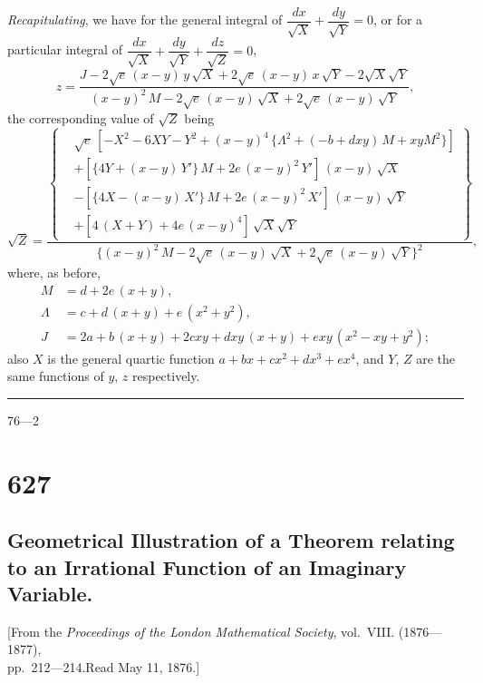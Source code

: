 \documentclass[12pt,a4paper]{article}
\begin{document}
\vspace{2ex}
\textit{Recapitulating}, we have for the general integral of $\dfrac{dx}{\surd X} + \dfrac{dy}{\surd Y} = 0$, or for a particular integral of $\dfrac{dx}{\surd X} + \dfrac{dy}{\surd Y} + \dfrac{dz}{\surd Z} = 0$,
\[
z = \frac{J - 2\surd e\,(x-y)\,y\,\surd X + 2\surd e\,(x-y)\,x\,\surd Y - 2\surd X\surd Y}{(x-y)^2\,M - 2\surd e\,(x-y)\,\surd X + 2\surd e\,(x-y)\,\surd Y},
\]
the corresponding value of $\surd Z$ being
\[
\surd Z = \frac{\left\{\begin{aligned} &\surd e\,[-X^2-6XY-Y^2+(x-y)^4\,\{\Lambda^2+(-b+dxy)\,M+xyM^2\}] \\
&+ [\{4Y+(x-y)\,Y'\}\,M+2e\,(x-y)^2\,Y']\,(x-y)\,\surd X \\
&- [\{4X-(x-y)\,X'\}\,M+2e\,(x-y)^2\,X']\,(x-y)\,\surd Y \\
&+ [4\,(X+Y)+4e\,(x-y)^4]\,\surd X\surd Y \end{aligned}\right\}}{\{(x-y)^2\,M - 2\surd e\,(x-y)\,\surd X + 2\surd e\,(x-y)\,\surd Y\}^2},
\]
where, as before,
\begin{align*}
M &= d + 2e\,(x+y), \\
\Lambda &= c + d\,(x+y) + e\,(x^2+y^2), \\
J &= 2a + b\,(x+y) + 2cxy + dxy\,(x+y) + exy\,(x^2-xy+y^2);
\end{align*}
also $X$ is the general quartic function $a+bx+cx^2+dx^3+ex^4$, and $Y$, $Z$ are the same functions of $y$, $z$ respectively.

\noindent\rule{2em}{0.4pt}\hfill 76---2
\newpage

\section*{627}
\subsection*{Geometrical Illustration of a Theorem relating to an Irrational Function of an Imaginary Variable.}

\begin{center}
\small
[From the \textit{Proceedings of the London Mathematical Society}, vol.~VIII. (1876---1877),\\
pp.~212---214.\quad Read May 11, 1876.]
\end{center}
\end{document}
